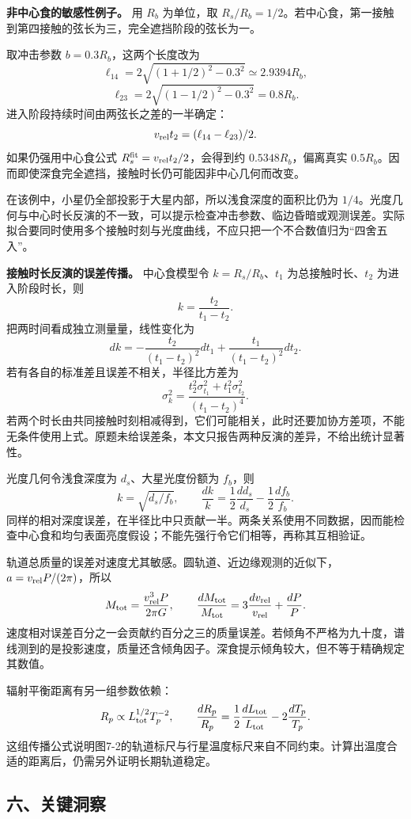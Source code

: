 \documentclass[12pt,a4paper,UTF8]{ctexart}
\begin{document}
\textbf{非中心食的敏感性例子。} 用 \(R_b\) 为单位，取
\(R_s/R_b=1/2\)。若中心食，第一接触到第四接触的弦长为三，完全遮挡阶段的弦长为一。

取冲击参数 \(b=0.3R_b\)，这两个长度改为 \[
\ell_{14}=2\sqrt{(1+1/2)^2-0.3^2}\simeq2.9394R_b,
\] \[
\ell_{23}=2\sqrt{(1-1/2)^2-0.3^2}=0.8R_b.
\] 进入阶段持续时间由两弦长之差的一半确定： \[
v_{\rm rel}t_2=(\ell_{14}-\ell_{23})/2.
\] 如果仍强用中心食公式 \(R_s^{\rm fit}=v_{\rm rel}t_2/2\)，会得到约
\(0.5348R_b\)，偏离真实
\(0.5R_b\)。因而即使深食完全遮挡，接触时长仍可能因非中心几何而改变。

在该例中，小星仍全部投影于大星内部，所以浅食深度的面积比仍为
\(1/4\)。光度几何与中心时长反演的不一致，可以提示检查冲击参数、临边昏暗或观测误差。实际拟合要同时使用多个接触时刻与光度曲线，不应只把一个不合数值归为``四舍五入''。

\textbf{接触时长反演的误差传播。} 中心食模型令 \(k=R_s/R_b\)、\(t_1\)
为总接触时长、\(t_2\) 为进入阶段时长，则 \[
k=\frac{t_2}{t_1-t_2}.
\] 把两时间看成独立测量量，线性变化为 \[
dk=-\frac{t_2}{(t_1-t_2)^2}dt_1+
\frac{t_1}{(t_1-t_2)^2}dt_2.
\] 若有各自的标准差且误差不相关，半径比方差为 \[
\sigma_k^2=\frac{t_2^2\sigma_{t_1}^2+t_1^2\sigma_{t_2}^2}
{(t_1-t_2)^4}.
\]
若两个时长由共同接触时刻相减得到，它们可能相关，此时还要加协方差项，不能无条件使用上式。原题未给误差条，本文只报告两种反演的差异，不给出统计显著性。

光度几何令浅食深度为 \(d_s\)、大星光度份额为 \(f_b\)，则 \[
k=\sqrt{d_s/f_b},\qquad
\frac{dk}{k}=\frac12\frac{dd_s}{d_s}-\frac12\frac{df_b}{f_b}.
\]
同样的相对深度误差，在半径比中只贡献一半。两条关系使用不同数据，因而能检查中心食和均匀表面亮度假设；不能先强行令它们相等，再称其互相验证。

轨道总质量的误差对速度尤其敏感。圆轨道、近边缘观测的近似下，\(a=v_{\rm rel}P/(2\pi)\)，所以
\[
M_{\rm tot}=\frac{v_{\rm rel}^3P}{2\pi G},\qquad
\frac{dM_{\rm tot}}{M_{\rm tot}}=3\frac{dv_{\rm rel}}{v_{\rm rel}}+\frac{dP}{P}.
\]
速度相对误差百分之一会贡献约百分之三的质量误差。若倾角不严格为九十度，谱线测到的是投影速度，质量还含倾角因子。深食提示倾角较大，但不等于精确规定其数值。

辐射平衡距离有另一组参数依赖： \[
R_p\propto L_{\rm tot}^{1/2}T_p^{-2},\qquad
\frac{dR_p}{R_p}=\frac12\frac{dL_{\rm tot}}{L_{\rm tot}}-2\frac{dT_p}{T_p}.
\]
这组传播公式说明图7-2的轨道标尺与行星温度标尺来自不同约束。计算出温度合适的距离后，仍需另外证明长期轨道稳定。

\subsection{六、关键洞察}\label{ux516dux5173ux952eux6d1eux5bdf-6}
\end{document}
